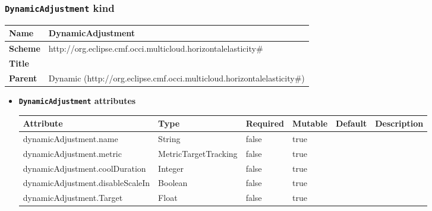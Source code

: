 \subsubsection{\texttt{DynamicAdjustment} kind}
\begin{center}
\begin{tabular}{|l|l|}
  \hline
  \textbf{Name} & DynamicAdjustment \\
  \hline  
  \textbf{Scheme} & http://org.eclipse.cmf.occi.multicloud.horizontalelasticity\# \\
  \hline
  \textbf{Title} &  \\
  \hline
  \textbf{Parent} & Dynamic (http://org.eclipse.cmf.occi.multicloud.horizontalelasticity\#) \\
  \hline
\end{tabular}
\end{center}
\begin{itemize}
\item \textbf{\texttt{DynamicAdjustment} attributes}

\begin{tabularx}{\textwidth}{|l|l|p{1.4cm}|p{1.3cm}|l|X|}
  \hline
  \textbf{Attribute} & \textbf{Type} & \textbf{Required} & \textbf{Mutable} & \textbf{Default} & \textbf{Description} \\
  \hline  
  dynamicAdjustment.name & String & false & true &  &  \\
  \hline
  dynamicAdjustment.metric & MetricTargetTracking & false & true &  &  \\
  \hline
  dynamicAdjustment.coolDuration & Integer & false & true &  &  \\
  \hline
  dynamicAdjustment.disableScaleIn & Boolean & false & true &  &  \\
  \hline
  dynamicAdjustment.Target & Float & false & true &  &  \\
  \hline
\end{tabularx}
\end{itemize}



